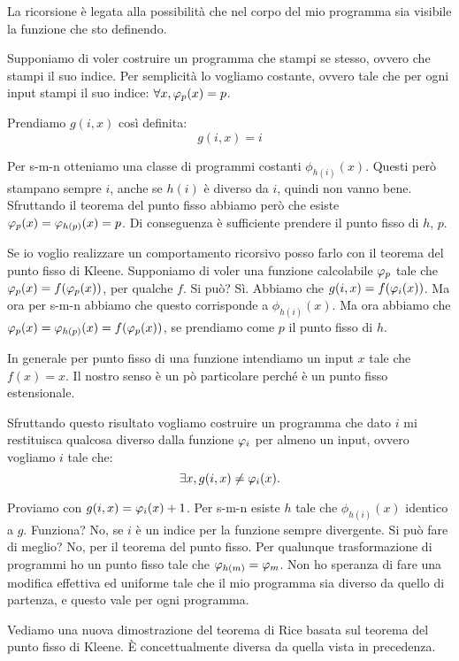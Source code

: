 La ricorsione è legata alla possibilità che nel corpo del mio programma sia visibile la funzione
che sto definendo.

Supponiamo di voler costruire un programma che stampi se stesso, ovvero che stampi il suo indice.
Per semplicità lo vogliamo costante, ovvero tale che per ogni input stampi il suo indice: $\forall
x, \varphi_{p}(x) = p$.

Prendiamo $g(i,x)$ così definita:
\begin{equation*}
    g(i,x) = i
\end{equation*}

Per s-m-n otteniamo una classe di programmi costanti $\phi_{h(i)}(x)$. Questi però stampano sempre
$i$, anche se $h(i)$ è diverso da $i$, quindi non vanno bene. Sfruttando il teorema del punto fisso
abbiamo però che esiste $\varphi_{p}(x) = \varphi_{h(p)}(x) = p$. Di conseguenza è sufficiente prendere il
punto fisso di $h$, $p$.

Se io voglio realizzare un comportamento ricorsivo posso farlo con il teorema del punto fisso di
Kleene. Supponiamo di voler una funzione calcolabile $\varphi_{p}$ tale che $\varphi_{p}(x) = f(\varphi_{p}(x))$, per
qualche $f$. Si può? Sì. Abbiamo che $g(i,x) = f(\varphi_{i}(x))$. Ma ora per s-m-n abbiamo che questo
corrisponde a $\phi_{h(i)}(x)$. Ma ora abbiamo che $\varphi_{p}(x) = \varphi_{h(p)}(x) = f(\varphi_{p}(x))$, se
prendiamo come $p$ il punto fisso di $h$.

In generale per punto fisso di una funzione intendiamo un input $x$ tale che $f(x) = x$. Il nostro
senso è un pò particolare perché è un punto fisso estensionale.

Sfruttando questo risultato vogliamo costruire un programma che dato $i$ mi restituisca qualcosa
diverso dalla funzione $\varphi_{i}$ per almeno un input, ovvero vogliamo $i$ tale che:
\begin{equation*}
    \exists x, g(i,x) \not= \varphi_{i}(x).
\end{equation*}

Proviamo con $g(i,x) = \varphi_{i}(x) + 1$. Per s-m-n esiste $h$ tale che $\phi_{h(i)}(x)$ identico a $g$. 
Funziona? No, se $i$ è un indice per la funzione sempre divergente. Si può fare di meglio? No, per
il teorema del punto fisso. Per qualunque trasformazione di programmi ho un punto fisso tale che
$\varphi_{h(m)} = \varphi_{m}$. Non ho speranza di fare una modifica effettiva ed uniforme tale che il mio
programma sia diverso da quello di partenza, e questo vale per ogni programma.

Vediamo una nuova dimostrazione del teorema di Rice basata sul teorema del punto fisso di Kleene. È
concettualmente diversa da quella vista in precedenza.

